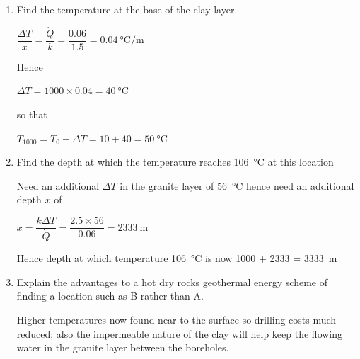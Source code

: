 \documentclass[a4paper,12pt,fleqn]{article}
\begin{document}
\begin{enumerate}[label=\alph*)]
\item  Find the temperature at the base of the clay layer.\par
$\dfrac{\Delta T}{x}=\dfrac{\dot Q}{k}=\dfrac{0.06}{1.5}=\SI{0.04}{\celsius\per\metre}$\par
Hence\par
$\Delta T= 1000\times 0.04 = \SI{40}{\celsius}$\par
so that\par
$T_{1000}=T_0 + \Delta T = 10 + 40 = \SI{50}{\celsius}$\par
\item  Find the depth at which the temperature reaches \SI{106}{\celsius} at this location\par
Need an additional $\Delta T$ in the granite layer of \SI{56}{\celsius} hence need an additional depth $x$ of\par
$x=\dfrac{k \Delta T}{\dot Q}=\dfrac{2.5\times 56}{0.06}=\SI{2333}{\metre}$\par
Hence depth at which temperature \SI{106}{\celsius} is now 1000 + 2333 = \SI{3333}{\metre}
\item  Explain the advantages to a hot dry rocks geothermal energy scheme of finding a location such as B rather than A.\par
Higher temperatures now found near to the surface so drilling costs much reduced; also the impermeable nature of the clay will help keep the flowing water in the granite layer between the boreholes.
\end{enumerate}
\printbibliography
\end{document}
